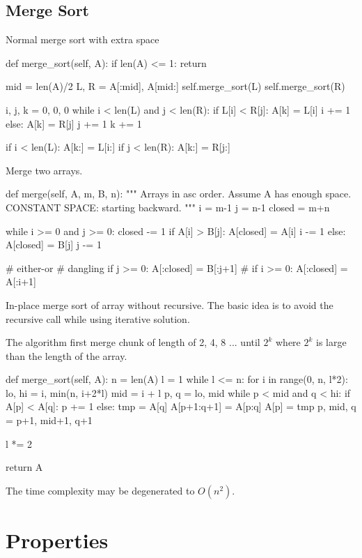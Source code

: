 \subsection{Merge Sort}
 Normal merge sort with extra space
\begin{python}
def merge_sort(self, A):
  if len(A) <= 1:
    return

  mid = len(A)/2
  L, R = A[:mid], A[mid:]
  self.merge_sort(L)
  self.merge_sort(R)

  i, j, k = 0, 0, 0
  while i < len(L) and j < len(R):
    if L[i] < R[j]:
      A[k] = L[i]
      i += 1
    else:
      A[k] = R[j]
      j += 1
    k += 1

  if i < len(L):
    A[k:] = L[i:]
  if j < len(R):
    A[k:] = R[j:]
\end{python}

 Merge two arrays.  
\begin{python}
def merge(self, A, m, B, n):
  """
  Arrays in asc order.
  Assume A has enough space.
  CONSTANT SPACE: starting backward. 
  """
  i = m-1
  j = n-1
  closed = m+n

  while i >= 0 and j >= 0:
    closed -= 1
    if A[i] > B[j]:
      A[closed] = A[i]
      i -= 1
    else:
      A[closed] = B[j]
      j -= 1

  # either-or
  # dangling
  if j >= 0: A[:closed] = B[:j+1]
  # if i >= 0: A[:closed] = A[:i+1]
\end{python}
In-place merge sort of array without recursive. The basic idea is to avoid the recursive call while using iterative solution.

The algorithm first merge chunk of length of 2, 4, 8 ... until $2^k$ where $2^k$ is large than the length of the array.
\begin{python}
def merge_sort(self, A):
  n = len(A)
  l = 1
  while l <= n:
    for i in range(0, n, l*2):
      lo, hi = i, min(n, i+2*l)
      mid = i + l
      p, q = lo, mid
      while p < mid and q < hi:
        if A[p] < A[q]:
          p += 1
        else:
          tmp = A[q]
          A[p+1:q+1] = A[p:q]
          A[p] = tmp
          p, mid, q = p+1, mid+1, q+1

    l *= 2

  return A
\end{python}
The time complexity may be degenerated to $O(n^2)$. 
\section{Properties}
